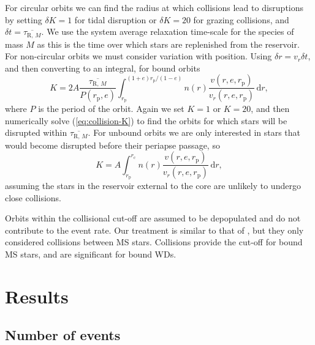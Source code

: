 \documentclass[useAMS,usedcolumn,usegraphicx,usenatbib]{mn2e}
\newcommand{\eqnref}[1]{(\ref{eq:#1})}
\newcommand{\sub}[1]{\ensuremath{_\mathrm{#1}}}
\newcommand{\dd}{\ensuremath{\mathrm{d}}}
\newcommand{\intd}[4]{\ensuremath{\displaystyle \int_{#1}^{#2}{#3}\,\dd{#4}}}
\begin{document}
For circular orbits we can find the radius at which collisions lead to disruptions by setting $\delta K = 1$ for tidal disruption or $\delta K = 20$ for grazing collisions, and $\delta t = \overline{\tau_{\mathrm{R},\,M}}$. We use the system average relaxation time-scale for the species of mass $M$ as this is the time over which stars are replenished from the reservoir. For non-circular orbits we must consider variation with position. Using $\delta r = v_r \delta t$, and then converting to an integral, for bound orbits
\begin{equation}
K = 2 A \frac{\overline{\tau_{\mathrm{R},\,M}}}{P(r\sub{p},e)}\intd{r\sub{p}}{(1+e)r\sub{p}/(1-e)}{n(r)\frac{v(r,e,r\sub{p})}{v_r(r,e,r\sub{p})}}{r},
\label{eq:collision-K}
\end{equation}
where $P$ is the period of the orbit. Again we set $K = 1$ or $K = 20$, and then numerically solve \eqnref{collision-K} to find the orbits for which stars will be disrupted within $\overline{\tau_{\mathrm{R},\,M}}$. For unbound orbits we are only interested in stars that would become disrupted before their periapse passage, so
\begin{equation}
K = A \intd{r\sub{p}}{r\sub{c}}{n(r)\frac{v(r,e,r\sub{p})}{v_r(r,e,r\sub{p})}}{r},
\end{equation}
assuming the stars in the reservoir external to the core are unlikely to undergo close collisions.

Orbits within the collisional cut-off are assumed to be depopulated and do not contribute to the event rate. Our treatment is similar to that of \citet{Hopman2007}, but they only considered collisions between MS stars. Collisions provide the cut-off for bound MS stars, and are significant for bound WDs.

\section{Results}\label{sec:Gal-Results}

\subsection{Number of events}\label{sec:no-events}
\end{document}
